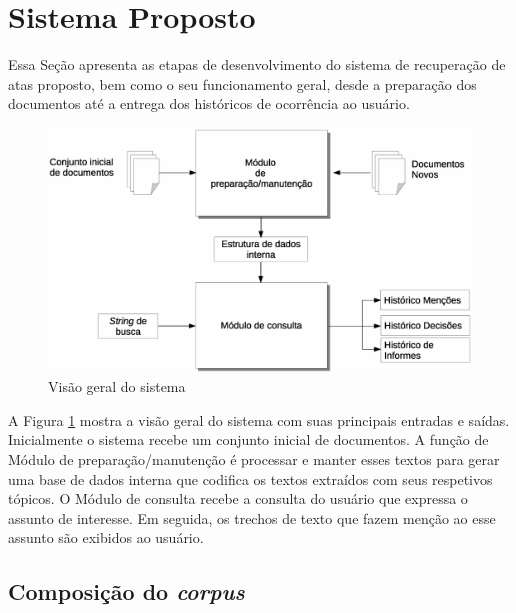 \section{Sistema Proposto}
\label{sec:sistema-proposto}

Essa Seção apresenta as etapas de desenvolvimento do sistema de recuperação de atas proposto, bem como o seu funcionamento geral, desde a preparação dos documentos até a entrega dos históricos de ocorrência ao usuário. 


  \begin{figure}[!h]
	  \centering
	  \includegraphics[width=0.69\paperwidth]{conteudo/capitulos/figs/visao-geral-3.eps}
	  \caption{Visão geral do sistema}
	  \label{fig:visao-geral}
  \end{figure}


A Figura \ref{fig:visao-geral} mostra a visão geral do sistema com suas principais entradas e saídas. Inicialmente o sistema recebe um conjunto inicial de documentos. A função de Módulo de preparação/manutenção é processar e manter esses textos para gerar uma base de dados interna que codifica os textos extraídos com seus respetivos tópicos. O Módulo de consulta recebe a consulta do usuário que expressa o assunto de interesse. Em seguida, os trechos de texto que fazem menção ao esse assunto são exibidos ao usuário.






\subsection{Composição do \textit{corpus} }
\label{subsec:composicaocorpus}



